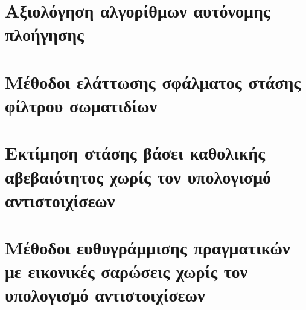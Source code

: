 \chapter{Αξιολόγηση αλγορίθμων αυτόνομης πλοήγησης}
  \label{appendix:01}
  

\chapter{Μέθοδοι ελάττωσης σφάλματος στάσης φίλτρου σωματιδίων}
  \label{appendix:02}
  

\chapter{Εκτίμηση στάσης βάσει καθολικής αβεβαιότητος χωρίς τον υπολογισμό αντιστοιχίσεων}
  \label{appendix:03}
  

\chapter{Μέθοδοι ευθυγράμμισης πραγματικών με εικονικές σαρώσεις χωρίς τον υπολογισμό αντιστοιχίσεων}
  \label{appendix:04}
  

